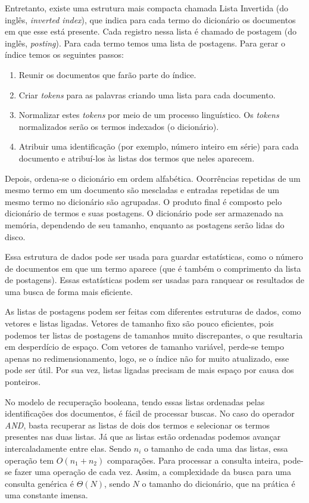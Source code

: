 Entretanto, existe uma estrutura mais compacta chamada Lista Invertida (do inglês, \emph{inverted index}), que indica para cada termo do dicionário os documentos em que esse está presente. Cada registro nessa lista é chamado de postagem (do inglês, \emph{posting}). Para cada termo temos uma lista de postagens. Para gerar o índice temos os seguintes passos:
\begin{enumerate}
\item Reunir os documentos que farão parte do índice.
\item Criar \emph{tokens} para as palavras criando uma lista para cada documento.
\item Normalizar estes \emph{tokens} por meio de um processo linguístico. Os \emph{tokens} normalizados serão os termos indexados (o dicionário).
\item Atribuir uma identificação (por exemplo, número inteiro em série) para cada documento e atribuí-los às listas dos termos que neles aparecem.
\end{enumerate}
Depois, ordena-se o dicionário em ordem alfabética. Ocorrências repetidas de um mesmo termo em um documento são mescladas e entradas repetidas de um mesmo termo no dicionário são agrupadas. O produto final é composto pelo dicionário de termos e suas postagens. O dicionário pode ser armazenado na memória, dependendo de seu tamanho, enquanto as postagens serão lidas do disco.

Essa estrutura de dados pode ser usada para guardar estatísticas, como o número de documentos em que um termo aparece (que é também o comprimento da lista de postagens). Essas estatísticas podem ser usadas para ranquear os resultados de uma busca de forma mais eficiente.

As listas de postagens podem ser feitas com diferentes estruturas de dados, como vetores e listas ligadas. Vetores de tamanho fixo são pouco eficientes, pois podemos ter listas de postagens de tamanhos muito discrepantes, o que resultaria em desperdício de espaço. Com vetores de tamanho variável, perde-se tempo apenas no redimensionamento, logo, se o índice não for muito atualizado, esse pode ser útil. Por sua vez, listas ligadas precisam de mais espaço por causa dos ponteiros.

No modelo de recuperação booleana, tendo essas listas ordenadas pelas identificações dos documentos, é fácil de processar buscas. No caso do operador \emph{AND}, basta recuperar as listas de dois dos termos e selecionar os termos presentes nas duas listas. Já que as listas estão ordenadas podemos avançar intercaladamente entre elas. Sendo $n_{i}$ o tamanho de cada uma das listas, essa operação tem $O(n_{1}+n_{2})$ comparações. Para processar a consulta inteira, pode-se fazer uma operação de cada vez. Assim, a complexidade da busca para uma consulta genérica é $\Theta(N)$, sendo $N$ o tamanho do dicionário, que na prática é uma constante imensa.

